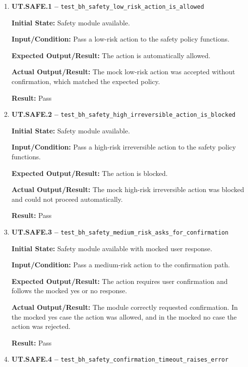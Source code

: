\documentclass[12pt]{article}
\begin{document}
\begin{enumerate}
    \item \textbf{UT.SAFE.1 --}
    \texttt{test\_bh\_safety\_low\_risk\_action\_is\_allowed}
    
    \textbf{Initial State:} Safety module available.
    
    \textbf{Input/Condition:} Pass a low-risk action to the safety
    policy functions.
    
    \textbf{Expected Output/Result:} The action is automatically
    allowed.
    
    \textbf{Actual Output/Result:} The mock low-risk action was
    accepted without confirmation, which matched the expected policy.
    
    \textbf{Result:} Pass
    
    \item \textbf{UT.SAFE.2 --}
    \texttt{test\_bh\_safety\_high\_irreversible\_action\_is\_blocked}
    
    \textbf{Initial State:} Safety module available.
    
    \textbf{Input/Condition:} Pass a high-risk irreversible action to
    the safety policy functions.
    
    \textbf{Expected Output/Result:} The action is blocked.
    
    \textbf{Actual Output/Result:} The mock high-risk irreversible
    action was blocked and could not proceed automatically.
    
    \textbf{Result:} Pass
    
    \item \textbf{UT.SAFE.3 --}
    \texttt{test\_bh\_safety\_medium\_risk\_asks\_for\_confirmation}
    
    \textbf{Initial State:} Safety module available with mocked user
    response.
    
    \textbf{Input/Condition:} Pass a medium-risk action to the
    confirmation path.
    
    \textbf{Expected Output/Result:} The action requires user
    confirmation and follows the mocked yes or no response.
    
    \textbf{Actual Output/Result:} The module correctly requested
    confirmation. In the mocked yes case the action was allowed, and
    in the mocked no case the action was rejected.
    
    \textbf{Result:} Pass
    
    \item \textbf{UT.SAFE.4 --}
    \texttt{test\_bh\_safety\_confirmation\_timeout\_raises\_error}
    

\end{enumerate}
\end{document}
